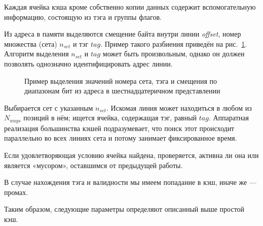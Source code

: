 \begin{enumerate*}
\item Каждая ячейка кэша кроме собственно копии данных содержит вспомогательную информацию, состоящую из тэга и группы флагов.

\item Из адреса в памяти выделяются смещение байта внутри линии \textit{offset}, номер множества (сета) $n_{set}$ и тэг $tag$. Пример такого разбиения приведён на рис.~\ref{fig:set-tag-flags}. Алгоритм выделения $n_{set}$ и $tag$ может быть произвольным, однако он должен позволять однозначно идентифицировать адрес линии.

\begin{figure}[htb]
    \centering
    \caption[Пример выделения значений номера сета, тэга и смещения из адреса]{Пример выделения значений номера сета, тэга и смещения по диапазонам бит из адреса в шестнадцатеричном представлении}
    \label{fig:set-tag-flags}
\end{figure}


\item Выбирается сет с указанным $n_{set}$. Искомая линия может находиться в любом из $N_{ways}$ позиций в нём; ищется ячейка, содержащая тэг, равный $tag$. Аппаратная реализация большинства кэшей подразумевает, что поиск этот происходит параллельно во всех линиях сета и потому занимает фиксированное время.

\item Если удовлетворяющая условию ячейка найдена, проверяется, активна ли она или является «мусором», оставшимся от предыдущей работы.

\item В случае нахождения тэга и валидности мы имеем попадание в кэш, иначе же — промах.
\end{enumerate*}

Таким образом, следующие параметры определяют описанный выше простой кэш.

